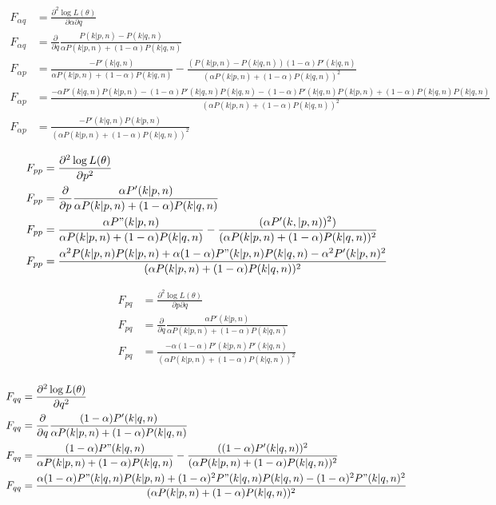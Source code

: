 \begin{align*}
F_{\alpha q} &= \frac{\partial^2\log L(\mathbb{\theta})}{\partial\alpha\partial q} \\
F_{\alpha q} &= \frac{\partial}{\partial q}\frac{P(k | p, n) - P(k | q, n)}{\alpha P(k | p, n) + (1-\alpha)P(k | q, n)} \\
F_{\alpha p} &= \frac{-P'(k | q, n)}{\alpha P(k | p, n) + (1-\alpha)P(k | q, n)} - \frac{(P(k | p, n) - P(k | q, n))(1 - \alpha)P'(k | q, n)}{(\alpha P(k | p, n) + (1 - \alpha) P(k | q, n))^2} \\
F_{\alpha p} &= \frac{-\alpha P'(k | q, n)P(k | p, n) - (1 - \alpha)P'(k | q, n)P(k | q, n) - (1 - \alpha)P'(k | q, n)P(k | p, n) + (1 - \alpha)P(k | q, n)P(k | q, n)}{(\alpha P(k | p, n) + (1 - \alpha) P(k | q, n))^2} \\
F_{\alpha p} &= \frac{-P'(k | q, n)P(k | p, n)}{(\alpha P(k | p, n) + (1 - \alpha) P(k | q, n))^2}
\end{align*}

\begin{align*}
F_{pp} &= \frac{\partial^2\log L(\mathbb{\theta})}{\partial p^2} \\
F_{pp} &= \frac{\partial}{\partial p}\frac{\alpha P'(k | p, n)}{\alpha P(k | p, n) + (1-\alpha)P(k | q, n)} \\ 
F_{pp} &= \frac{\alpha P"(k | p, n)}{\alpha P(k | p, n) + (1-\alpha)P(k | q, n)} - \frac{(\alpha P'(k, | p, n))^2)}{(\alpha P(k | p, n) + (1 - \alpha) P(k | q, n))^2} \\
F_{pp} &= \frac{\alpha^2P(k | p, n)P(k | p, n) + \alpha(1 - \alpha)P"(k | p, n)P(k | q, n) - \alpha^2P'(k | p, n)^2}{(\alpha P(k | p, n) + (1 - \alpha) P(k | q, n))^2} \\
\end{align*}

\begin{align*}
F_{pq} &= \frac{\partial^2\log L(\mathbb{\theta})}{\partial p\partial q} \\
F_{pq} &= \frac{\partial}{\partial q}\frac{\alpha P'(k | p, n)}{\alpha P(k | p, n) + (1-\alpha)P(k | q, n)} \\ 
F_{pq} &= \frac{-\alpha(1 - \alpha)P'(k | p, n)P'(k | q, n)}{(\alpha P(k | p, n) + (1 - \alpha) P(k | q, n))^2} \\
\end{align*}

\begin{align*}
F_{qq} &= \frac{\partial^2\log L(\mathbb{\theta})}{\partial q^2} \\
F_{qq} &= \frac{\partial}{\partial q}\frac{(1 - \alpha) P'(k | q, n)}{\alpha P(k | p, n) + (1-\alpha)P(k | q, n)} \\
F_{qq} &= \frac{(1 - \alpha) P"(k | q, n)}{\alpha P(k | p, n) + (1-\alpha)P(k | q, n)} - \frac{((1 - \alpha)P'(k | q, n))^2}{(\alpha P(k | p, n) + (1 - \alpha) P(k | q, n))^2} \\
F_{qq} &= \frac{\alpha(1 - \alpha)P"(k | q, n)P(k | p, n) + (1 - \alpha)^2P"(k | q, n)P(k | q, n) - (1 - \alpha)^2P"(k | q, n)^2}{(\alpha P(k | p, n) + (1 - \alpha) P(k | q, n))^2}
\end{align*}